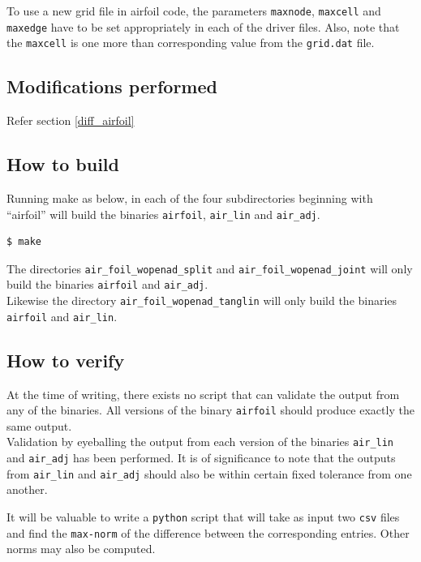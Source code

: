 \begin{NotePar}
\noindent To use a new grid file in airfoil code, the parameters \texttt{maxnode}, \texttt{maxcell} and \texttt{maxedge} have to be set appropriately in each of the driver files. Also, note that the \texttt{maxcell} is one more than corresponding value from the \texttt{grid.dat} file.
\end{NotePar}
\subsection{Modifications performed}
Refer section \ref{diff_airfoil}
\subsection{How to build}
Running make as below, in each of the four subdirectories beginning with ``airfoil'' will build the  binaries \texttt{airfoil}, \texttt{air\_lin} and \texttt{air\_adj}.
\hfill\break
\begin{lstlisting}[language=mybash, numbers=none]
    $ make
\end{lstlisting}
\begin{NotePar}
\noindent  The directories \texttt{air\_foil\_wopenad\_split} and \texttt{air\_foil\_wopenad\_joint} will only build the binaries \texttt{airfoil} and \texttt{air\_adj}.\\

\noindent Likewise the directory \texttt{air\_foil\_wopenad\_tanglin} will only build the binaries \texttt{airfoil} and \texttt{air\_lin}.
\end{NotePar}
\subsection{How to verify}
At the time of writing, there exists no script that can validate the output from any of the binaries. All versions of the binary \texttt{airfoil} should produce exactly the same output.\\

\noindent Validation by eyeballing the output from each version of the binaries \texttt{air\_lin} and  \texttt{air\_adj} has been performed. It is of significance to note that the outputs from \texttt{air\_lin} and  \texttt{air\_adj} should also be within certain fixed tolerance from one another.

\begin{TodoPar}
\noindent It will be valuable to write a \texttt{python} script that will take as input two \texttt{csv} files and find the \texttt{max-norm} of the difference between the corresponding entries. Other norms may also be computed. 
\end{TodoPar}


